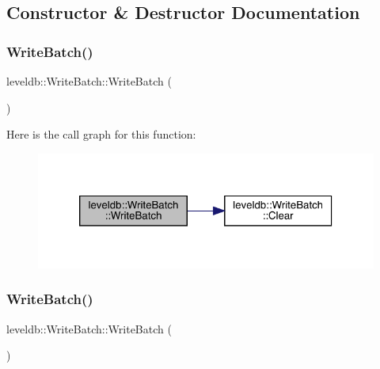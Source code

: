 \subsection{Constructor \& Destructor Documentation}
\mbox{\label{classleveldb_1_1_write_batch_a5287eda973cfd100149a034c871dcc44}} 
\subsubsection{\texorpdfstring{WriteBatch()}{WriteBatch()}\hspace{0.1cm}{\footnotesize\ttfamily [1/2]}}
{\footnotesize\ttfamily leveldb\+::\+Write\+Batch\+::\+Write\+Batch (\begin{DoxyParamCaption}{ }\end{DoxyParamCaption})}

Here is the call graph for this function\+:
\nopagebreak
\begin{figure}[H]
\begin{center}
\leavevmode
\includegraphics[width=320pt]{classleveldb_1_1_write_batch_a5287eda973cfd100149a034c871dcc44_cgraph}
\end{center}
\end{figure}
\mbox{\label{classleveldb_1_1_write_batch_a61a12adbdb41477fbdc8a0c74fb09cad}} 
\subsubsection{\texorpdfstring{WriteBatch()}{WriteBatch()}\hspace{0.1cm}{\footnotesize\ttfamily [2/2]}}
{\footnotesize\ttfamily leveldb\+::\+Write\+Batch\+::\+Write\+Batch (\begin{DoxyParamCaption}\item[{const \mbox{\hyperlink{classleveldb_1_1_write_batch}{Write\+Batch}} \&}]{ }\end{DoxyParamCaption})\hspace{0.3cm}{\ttfamily [default]}}

